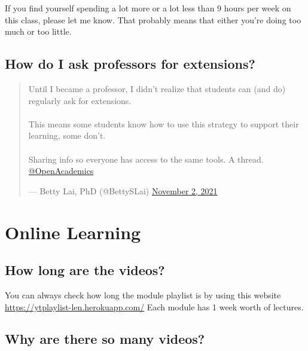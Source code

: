If you find yourself spending a lot more or a lot less than 9 hours per week on this class, please let me know. That probably means that either you're doing too much or too little.

\hypertarget{how-do-i-ask-professors-for-extensions}{%
\subsection{How do I ask professors for extensions?}\label{how-do-i-ask-professors-for-extensions}}

\begin{quote}
Until I became a professor, I didn't realize that students can (and
do) regularly ask for extensions.\\
~\\
This means some students know how to use this strategy to support
their learning, some don't.\\
~\\
Sharing info so everyone has access to the same tools. A thread.
\href{https://twitter.com/OpenAcademics}{@OpenAcademics}

\begin{flushright}--- Betty Lai, PhD (@BettySLai) \href{https://twitter.com/BettySLai/status/1455555111397117954}{November 2,
2021}\end{flushright}
\end{quote}

\hypertarget{online-learning}{%
\section{Online Learning}\label{online-learning}}

\hypertarget{how-long-are-the-videos}{%
\subsection{How long are the videos?}\label{how-long-are-the-videos}}

You can always check how long the module playlist is by using this website \url{https://ytplaylist-len.herokuapp.com/}
Each module has 1 week worth of lectures.

\hypertarget{why-are-there-so-many-videos}{%
\subsection{Why are there so many videos?}\label{why-are-there-so-many-videos}}

